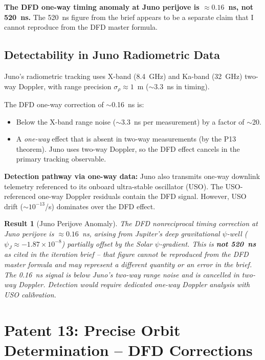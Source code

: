 \documentclass[aps,prd,twocolumn,superscriptaddress,nofootinbib]{revtex4-2}
\newtheorem{result}{Result}
\begin{document}
\textbf{The DFD one-way timing anomaly at Juno perijove is
$\approx 0.16$~ns, not 520~ns.} The 520~ns figure from the brief
appears to be a separate claim that I cannot reproduce from the
DFD master formula.

\subsection{Detectability in Juno Radiometric Data}

Juno's radiometric tracking uses X-band (8.4~GHz) and Ka-band
(32~GHz) two-way Doppler, with range precision
$\sigma_\rho \approx 1$~m ($\sim$3.3~ns in timing).

The DFD one-way correction of $\sim$0.16~ns is:
\begin{itemize}
\item Below the X-band range noise ($\sim$3.3~ns per measurement)
by a factor of $\sim$20.
\item A \emph{one-way} effect that is absent in two-way measurements
(by the P13 theorem). Juno uses two-way Doppler, so the DFD effect
cancels in the primary tracking observable.
\end{itemize}

\textbf{Detection pathway via one-way data:} Juno also transmits
one-way downlink telemetry referenced to its onboard ultra-stable
oscillator (USO). The USO-referenced one-way Doppler residuals
contain the DFD signal. However, USO drift ($\sim 10^{-13}$/s)
dominates over the DFD effect.

\begin{result}[Juno Perijove Anomaly]
The DFD nonreciprocal timing correction at Juno perijove is
$\approx 0.16$~ns, arising from Jupiter's deep gravitational $\psi$-well
($\psi_J \approx -1.87\times10^{-8}$) partially offset by the
Solar $\psi$-gradient. This is \textbf{not 520~ns} as cited in the
iteration brief -- that figure cannot be reproduced from the DFD
master formula and may represent a different quantity or an error
in the brief. The 0.16~ns signal is below Juno's two-way range
noise and is cancelled in two-way Doppler. Detection would require
dedicated one-way Doppler analysis with USO calibration.
\end{result}

\section{Patent 13: Precise Orbit Determination -- DFD Corrections}
\label{sec:pod}
\end{document}
